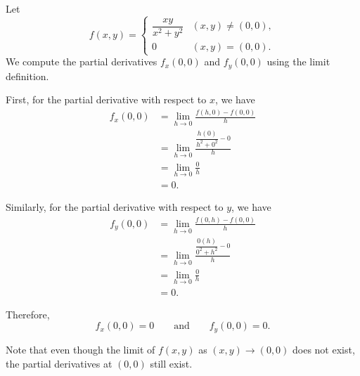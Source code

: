 	\begin{example}
	  \label{ex:partial-derivatives-using-limit-definition}
		Let 
		\begin{equation}
			f(x, y) =
			\begin{cases}
				\dfrac{xy}{x^2+y^2} & (x,y) \neq (0,0), \\
				0 & (x,y) = (0,0).
			\end{cases}
		\end{equation}
		We compute the partial derivatives $f_x(0,0)$ and $f_y(0,0)$ using the limit definition.

		First, for the partial derivative with respect to $x$, we have
		\begin{align}
			f_x(0,0)
			&=
			\lim_{h\to 0}
			\frac{f(h,0)-f(0,0)}{h} \\
			&=
			\lim_{h\to 0}
			\frac{\dfrac{h(0)}{h^2+0^2}-0}{h} \\
			&=
			\lim_{h\to 0}
			\frac{0}{h} \\
			&= 0.
		\end{align}

		Similarly, for the partial derivative with respect to $y$, we have
		\begin{align}
			f_y(0,0)
			&=
			\lim_{h\to 0}
			\frac{f(0,h)-f(0,0)}{h} \\
			&=
			\lim_{h\to 0}
			\frac{\dfrac{0(h)}{0^2+h^2}-0}{h} \\
			&=
			\lim_{h\to 0}
			\frac{0}{h} \\
			&= 0.
		\end{align}

		Therefore,
		\begin{equation}
			f_x(0,0)=0
			\qquad \text{and} \qquad
			f_y(0,0)=0.
		\end{equation}

		Note that even though the limit of $f(x,y)$ as $(x,y)\to(0,0)$ does not exist, the partial derivatives at $(0,0)$ still exist.

		\begin{figure}[H]
			\centering
\end{figure}
\end{example}
